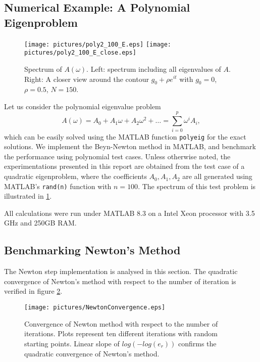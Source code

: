 \documentclass[final,leqno,onefignum,onetabnum]{siamltex1213}
\begin{document}
\subsection{Numerical Example: A Polynomial Eigenproblem}
\begin{figure}
\label{fig:E}
\begin{center}
\texttt{[image: pictures/poly2\_100\_E.eps]}
\texttt{[image: pictures/poly2\_100\_E\_close.eps]}
\end{center}
\caption{Spectrum of $A(\omega)$. \textnormal{Left: spectrum including all eigenvalues of $A$. Right: A closer view around the contour $g_0+\rho e^{it}$ with $g_0=0$, $\rho=0.5$, $N=150$.}}
\end{figure}

Let us consider the polynomial eigenvalue problem 
\begin{equation}
\label{eq:polyeig}
A(\omega)= A_0+A_1 \omega + A_2 \omega^2 + \ldots =\sum\limits_{i=0}^{p}\omega^iA_i ,
\end{equation}
which can be easily solved using the MATLAB function {\tt polyeig} for the exact solutions. We implement the Beyn-Newton method in MATLAB, and benchmark the performance using polynomial test cases. Unless otherwise noted, the experimentations presented in this report are obtained from the test case of a quadratic eigenproblem, where the coefficients $A_0, A_1, A_2$ are all generated using MATLAB's {\tt rand(n)} function with $n=100$. The spectrum of this test problem is illustrated in \ref{fig:E}.  



All calculations were run under MATLAB 8.3 on a Intel Xeon processor with 3.5 GHz and 250GB RAM. 
\subsection{Benchmarking Newton's Method}
The Newton step implementation is analysed in this section. The quadratic convergence of Newton's method with respect to the number of iteration is verified in figure \ref{fig:NewtonBenchmark}.
\begin{figure}\label{fig:NewtonBenchmark}
\begin{center}
\texttt{[image: pictures/NewtonConvergence.eps]}
\end{center}
\caption{Convergence of Newton method with respect to the number of iterations. \textnormal{Plots represent ten different iterations with random starting points. Linear slope of $log(-log(e_r))$ confirms the quadratic convergence of Newton's method.}}
\end{figure}
\end{document}
